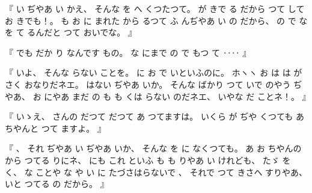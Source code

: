 %
『
い
ぢやあ
い
かえ、
%
そんな
を
へ
くつたつて。
%
が
きで
る
だから
つて
して
お
きでも！。
%
も
お
に
まれた
から
るつて
ふ
んぢやあ
い
の
だから、
%
の
で
な
を
て
るんだと
つて
おいでな。
』

%
『
でも
だか
り
なんです
もの。
%
な
にまで
の
で%
もつ
て
‥‥
』

%
『
いよ、
%
そんな
らない
ことを。
%
に
お
で
いといふのに。
%
ホヽヽ
お
は
は
が
さく
おなりだネエ。
%
はない
ぢやあ
いか。
%
そんな
ばかり
つて
いで
のやう
ぢやあ、
%
お
にやあ
まだ
の
も
も
くは
らない
のだネエ、
%
いやな
だ
ことネ！。
』

%
『
いゝえ、
%
さんの
だつて
だつて
あ
つてますは。
%
%
いくら
が
ぢや
くつても
あ
ちやんと
つて
ますよ。
』

%
『
、
%
それ
ぢやあ
い
ぢやあ
いか、
%
そんな
を
に
なくつても。
%
あ
お
ちやんの
から
つてる
りにネ、
%
にも
これ
といふ
も
も
りやあ
い
けれども、
%
たゞ
を
く、
%
な
ことや
な
や
い
に
たづさはらないで
、
%
%
それで
つて%
きさへ
すりやあ、
%
いと
つてる
の
だから。
』

